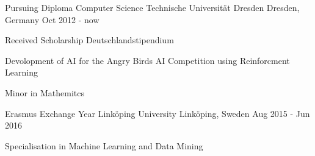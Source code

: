 \begin{cventries}
	\cventry
	{Pursuing Diploma Computer Science} %
	{Technische Universität Dresden} %
	{Dresden, Germany} %
	{Oct 2012 - now} %
	{
		\begin{cvitems} %
		\item {Received Scholarship Deutschlandstipendium}
		\item{Devolopment of AI for the Angry Birds AI Competition using Reinforcment Learning}
		\item{Minor in Mathemitcs}
		\end{cvitems}
	}

	\cventry
	{Erasmus Exchange Year} %
	{Linköping University} %
	{Linköping, Sweden} %
	{Aug 2015 - Jun 2016} %
	{
		\begin{cvitems} %
		\item{Specialisation in Machine Learning and Data Mining}
		\end{cvitems}
	}
\end{cventries}

